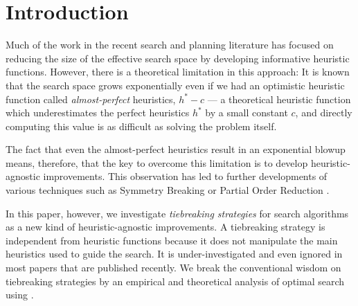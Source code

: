 
\section{Introduction}
\label{sec:introduction}

Much of the work in the recent search and planning literature has focused on
reducing the size of the effective search space by developing
informative heuristic functions. However, there is a theoretical
limitation in this approach: It is known that the search space grows
exponentially even if we had an optimistic
heuristic function called \emph{almost-perfect} heuristics,
$h^*-c$ \cite{helmert2008good} --- a
theoretical heuristic function which
underestimates the perfect heuristics $h^*$ by a small constant
$c$, and directly computing this value is as difficult as solving the
problem itself.

The fact that even the almost-perfect heuristics result in an exponential
blowup means, therefore, that the key to overcome this limitation is
to develop heuristic-agnostic improvements. This observation has
led to further developments of various techniques such as Symmetry Breaking
\cite{Fox1998,pochter2011exploiting,domshlak2013symmetry} or Partial
Order Reduction \cite{hall2013faster,wehrle2013relative}.

In this paper,
however, we investigate \emph{tiebreaking strategies} for search algorithms as
a new kind of heuristic-agnostic improvements. A tiebreaking strategy is
independent from heuristic functions because it does not manipulate the
main heuristics used to guide the search. It is under-investigated
and even ignored in most papers that are published recently.
We break the conventional wisdom on tiebreaking strategies by an
empirical and theoretical analysis of optimal search using \astar.
 

